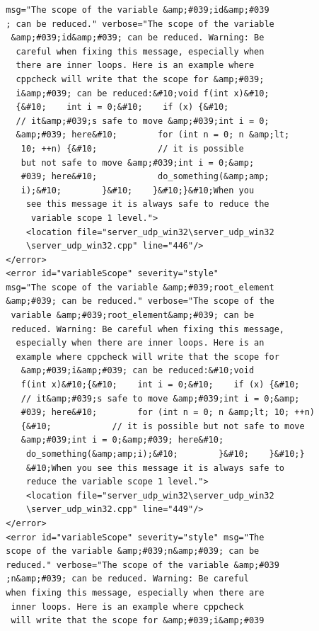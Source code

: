 \documentclass[10pt,a4paper]{report}
\begin{document}
\begin{lstlisting}
        msg="The scope of the variable &amp;#039;id&amp;#039
        ; can be reduced." verbose="The scope of the variable
         &amp;#039;id&amp;#039; can be reduced. Warning: Be
          careful when fixing this message, especially when 
          there are inner loops. Here is an example where 
          cppcheck will write that the scope for &amp;#039;
          i&amp;#039; can be reduced:&#10;void f(int x)&#10;
          {&#10;    int i = 0;&#10;    if (x) {&#10;        
          // it&amp;#039;s safe to move &amp;#039;int i = 0;
          &amp;#039; here&#10;        for (int n = 0; n &amp;lt;
           10; ++n) {&#10;            // it is possible 
           but not safe to move &amp;#039;int i = 0;&amp;
           #039; here&#10;            do_something(&amp;amp;
           i);&#10;        }&#10;    }&#10;}&#10;When you
            see this message it is always safe to reduce the
             variable scope 1 level.">
            <location file="server_udp_win32\server_udp_win32
            \server_udp_win32.cpp" line="446"/>
        </error>
        <error id="variableScope" severity="style" 
        msg="The scope of the variable &amp;#039;root_element
        &amp;#039; can be reduced." verbose="The scope of the
         variable &amp;#039;root_element&amp;#039; can be 
         reduced. Warning: Be careful when fixing this message,
          especially when there are inner loops. Here is an 
          example where cppcheck will write that the scope for
           &amp;#039;i&amp;#039; can be reduced:&#10;void 
           f(int x)&#10;{&#10;    int i = 0;&#10;    if (x) {&#10;        
           // it&amp;#039;s safe to move &amp;#039;int i = 0;&amp;
           #039; here&#10;        for (int n = 0; n &amp;lt; 10; ++n) 
           {&#10;            // it is possible but not safe to move 
           &amp;#039;int i = 0;&amp;#039; here&#10;           
            do_something(&amp;amp;i);&#10;        }&#10;    }&#10;}
            &#10;When you see this message it is always safe to 
            reduce the variable scope 1 level.">
            <location file="server_udp_win32\server_udp_win32
            \server_udp_win32.cpp" line="449"/>
        </error>
        <error id="variableScope" severity="style" msg="The 
        scope of the variable &amp;#039;n&amp;#039; can be 
        reduced." verbose="The scope of the variable &amp;#039
        ;n&amp;#039; can be reduced. Warning: Be careful 
        when fixing this message, especially when there are
         inner loops. Here is an example where cppcheck 
         will write that the scope for &amp;#039;i&amp;#039

\end{lstlisting}
\end{document}
